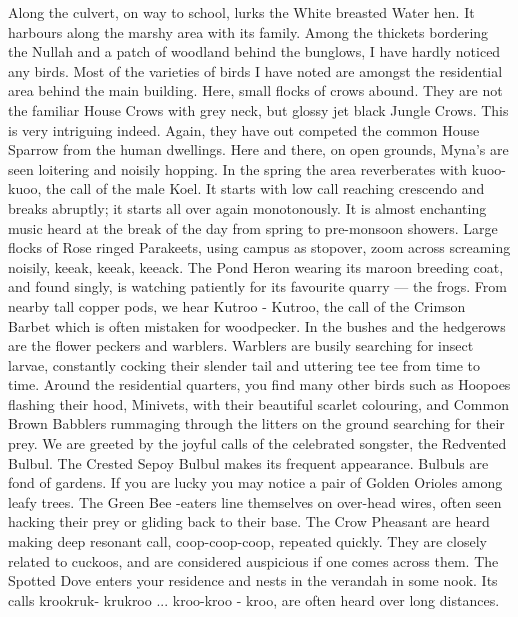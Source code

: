 Along the culvert, on way to school, lurks the White breasted 
Water hen. It harbours along the marshy area with its family. Among the 
thickets bordering the Nullah and a patch of woodland behind the bunglows, 
I have hardly noticed any birds. Most of the varieties of birds I have noted 
are amongst the residential area behind the main building. Here, small 
flocks of crows abound. They are not the familiar House Crows with grey 
neck, but glossy jet black Jungle Crows. This is very intriguing indeed. 
Again, they have out competed the common House Sparrow from the human 
dwellings. Here and there, on open grounds, Myna's are seen loitering and 
noisily hopping. In the spring the area reverberates with kuoo-kuoo, the call 
of the male Koel. It starts with low call reaching crescendo and breaks 
abruptly; it starts all over again monotonously. It is almost enchanting music 
heard at the break of the day from spring to pre-monsoon showers. Large 
flocks of Rose ringed Parakeets, using campus as stopover, zoom across 
screaming noisily, keeak, keeak, keeack. The Pond Heron wearing its 
maroon breeding coat, and found singly, is watching patiently for its 
favourite quarry --- the frogs. From nearby tall copper pods, we hear Kutroo - Kutroo, the call of the Crimson Barbet which is often mistaken for 
woodpecker. In the bushes and the hedgerows are the flower peckers and 
warblers. Warblers are busily searching for insect larvae, constantly cocking 
their slender tail and uttering tee tee from time to time. Around the 
residential quarters, you find many other birds such as Hoopoes flashing 
their hood, Minivets, with their beautiful scarlet colouring, and Common 
Brown Babblers rummaging through the litters on the ground searching for 
their prey. We are greeted by the joyful calls of the celebrated songster, the 
Redvented Bulbul. The Crested Sepoy Bulbul makes its frequent 
appearance. Bulbuls are fond of gardens. If you are lucky you may notice a 
pair of Golden Orioles among leafy trees. The Green Bee -eaters line 
themselves on over-head wires, often seen hacking their prey or gliding back 
to their base. The Crow Pheasant are heard making deep resonant call, 
coop-coop-coop, repeated quickly. They are closely related to cuckoos, and 
are considered auspicious if one comes across them. The Spotted Dove 
enters your residence and nests in the verandah in some nook. Its calls krookruk-
krukroo ... kroo-kroo - kroo, are often heard over long distances. 

